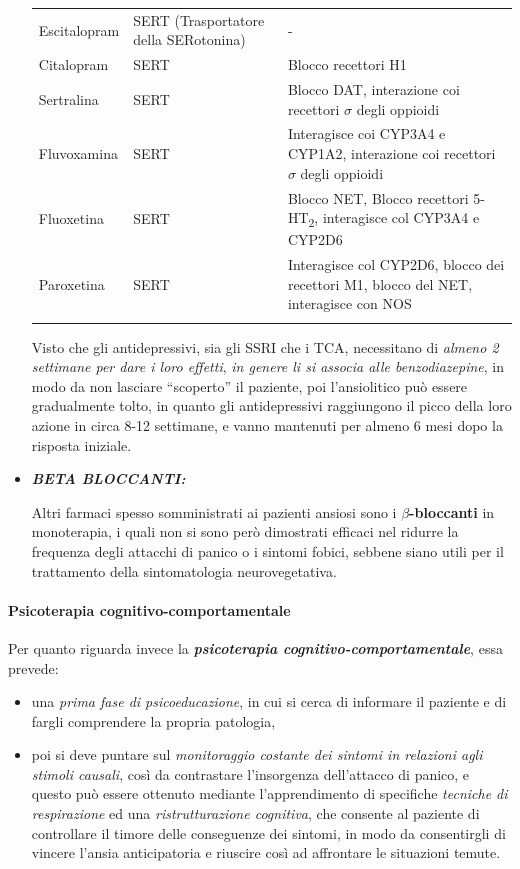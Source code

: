 \begin{itemize}
\begin{table}
\begin{tabular}{p{}p{}p{}}
Escitalopram & SERT (Trasportatore della SERotonina) & - \\
Citalopram & SERT & Blocco recettori H1 \\
Sertralina & SERT & Blocco DAT, interazione coi recettori $\sigma$ degli oppioidi \\
Fluvoxamina & SERT & Interagisce coi CYP3A4 e CYP1A2, interazione coi recettori $\sigma$ degli oppioidi \\
Fluoxetina & SERT & Blocco NET, Blocco recettori 5-HT\textsubscript{2}, interagisce col CYP3A4 e CYP2D6 \\
Paroxetina & SERT & Interagisce col CYP2D6, blocco dei recettori M1, blocco del NET, interagisce con NOS \\

\noalign{\smallskip}\hline\noalign{\smallskip}
\end{tabular}
\end{table}


Visto che gli antidepressivi, sia gli SSRI che i TCA, necessitano di
\emph{almeno 2 settimane per dare i loro effetti}, \emph{in genere li si
associa alle benzodiazepine}, in modo da non lasciare ``scoperto'' il
paziente, poi l'ansiolitico può essere gradualmente tolto, in quanto gli
antidepressivi raggiungono il picco della loro azione in circa 8-12
settimane, e vanno mantenuti per almeno 6 mesi dopo la risposta
iniziale.

\item
  \textbf{\emph{BETA BLOCCANTI:}}

Altri farmaci spesso somministrati ai pazienti ansiosi sono i
\textbf{$\beta$-bloccanti} in monoterapia, i quali non si sono però dimostrati
efficaci nel ridurre la frequenza degli attacchi di panico o i sintomi
fobici, sebbene siano utili per il trattamento della sintomatologia
neurovegetativa.
\end{itemize}

\paragraph{Psicoterapia cognitivo-comportamentale}

Per quanto riguarda invece la \textbf{\emph{psicoterapia cognitivo-comportamentale}}, essa prevede:

\begin{itemize}
\item
  una \emph{prima fase di psicoeducazione}, in cui si cerca di informare
  il paziente e di fargli comprendere la propria patologia,
\item
  poi si deve puntare sul \emph{monitoraggio costante dei sintomi in
  relazioni agli stimoli causali}, così da contrastare l'insorgenza
  dell'attacco di panico, e questo può essere ottenuto mediante
  l'apprendimento di specifiche \emph{tecniche di respirazione} ed una
  \emph{ristrutturazione cognitiva}, che consente al paziente di
  controllare il timore delle conseguenze dei sintomi, in modo da
  consentirgli di vincere l'ansia anticipatoria e riuscire così ad
  affrontare le situazioni temute.
\end{itemize}

